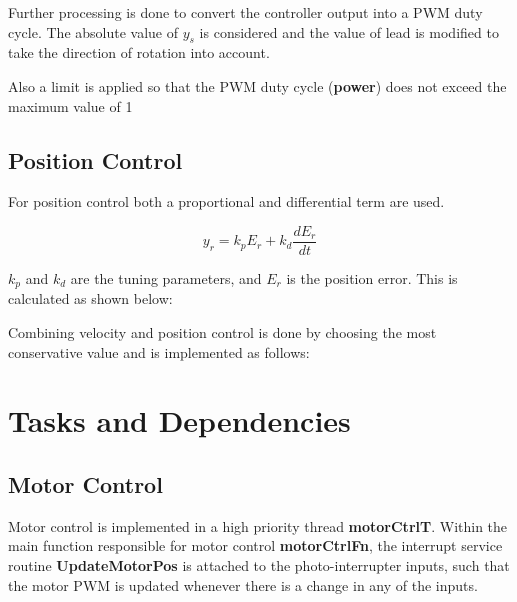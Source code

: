 \documentclass{article}
\begin{document}
\bigskip




\bigskip

Further processing is done to convert the controller output into a PWM duty cycle. The absolute value of \(y_s\) is considered and the value of lead is modified to take the direction of rotation into account.

\bigskip



\bigskip

Also a limit is applied so that the PWM duty cycle (\textbf{power}) does not exceed the maximum value of 1

\bigskip



\bigskip

\subsection{Position Control}

For position control both a proportional and differential term are used.

\[y_r = k_pE_r + k_d \frac{dE_r}{dt}\]

\(k_p\) and \(k_d\) are the tuning parameters, and \(E_r\) is the position error. This is calculated as shown below:

\bigskip

\bigskip

Combining velocity and position control is done by choosing the most conservative value and is implemented as follows:

\bigskip

\bigskip



\section{Tasks and Dependencies}
\subsection{Motor Control}

Motor control is implemented in a high priority thread \textbf{motorCtrlT}. Within the main function responsible for motor control \textbf{motorCtrlFn}, the interrupt service routine \textbf{UpdateMotorPos} is attached to the photo-interrupter inputs, such that the motor PWM is updated whenever there is a change in any of the inputs.
\end{document}
